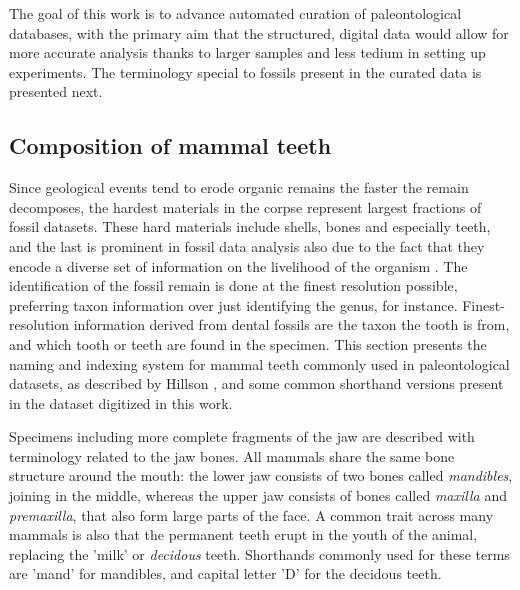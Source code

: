 \documentclass{article}
\begin{document}
The goal of this work is to advance automated curation of paleontological databases, 
with the primary aim that the structured, digital data would allow for 
more accurate analysis thanks to larger samples and less tedium in 
setting up experiments. The terminology special to fossils present in 
the curated data is presented next.

\subsection{Composition of mammal teeth}
\label{sect:mammal_teeth}


Since geological events tend to erode organic remains the faster the remain decomposes, the hardest materials in 
the corpse represent largest fractions of fossil datasets. These hard materials include shells, bones and especially teeth, and 
the last is prominent in fossil data analysis also due to the fact that they encode a diverse set of information on 
the livelihood of the organism \cite{Faith_Lyman_2019}. The identification of the fossil remain is done at the finest resolution possible,
preferring taxon information over just identifying the genus, for instance. Finest-resolution information 
derived from dental fossils are the taxon the tooth is from, and which tooth or teeth are found in the specimen.
This section presents the naming and indexing system for mammal teeth commonly used in paleontological datasets,
as described by Hillson \cite{Hillson_2005}, and some common shorthand versions present in the dataset digitized in this work.

Specimens including more complete fragments of the jaw are described with terminology related 
to the jaw bones. All mammals share the same bone structure around the mouth: the lower jaw consists 
of two bones called \textit{mandibles}, joining in the middle, whereas the upper jaw consists of bones called 
\textit{maxilla} and \textit{premaxilla}, that also form large parts of the face.
A common trait across many mammals is also that the permanent teeth erupt in the 
youth of the animal, replacing the 'milk' or \textit{decidous} teeth. Shorthands commonly used for these 
terms are 'mand' for mandibles, and capital letter 'D' for the decidous teeth.
\end{document}
